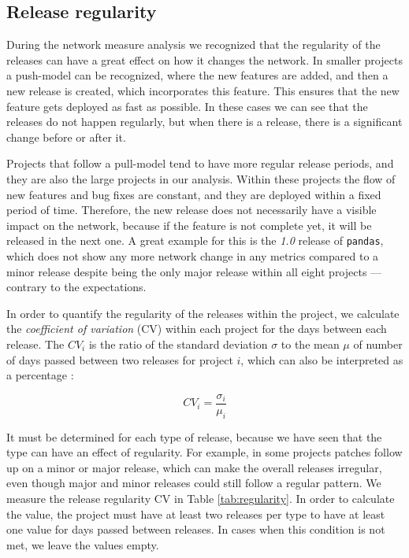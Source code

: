 \subsection{Release regularity}
\label{sec:release_reg}

During the network measure analysis we recognized that the regularity of the releases can have a great effect on how it changes the network. In smaller projects a push-model can be recognized, where the new features are added, and then a new release is created, which incorporates this feature. This ensures that the new feature gets deployed as fast as possible. In these cases we can see that the releases do not happen regularly, but when there is a release, there is a significant change before or after it.

Projects that follow a pull-model tend to have more regular release periods, and they are also the large projects in our analysis. Within these projects the flow of new features and bug fixes are constant, and they are deployed within a fixed period of time. Therefore, the new release does not necessarily have a visible impact on the network, because if the feature is not complete yet, it will be released in the next one. A great example for this is the \textit{1.0} release of \texttt{pandas}, which does not show any more network change in any metrics compared to a minor release despite being the only major release within all eight projects — contrary to the expectations.

In order to quantify the regularity of the releases within the project, we calculate the \textit{coefficient of variation} (CV) within each project for the days between each release. The $CV_i$ is the ratio of the standard deviation $\sigma$ to the mean $\mu$ of number of days passed between two releases for project $i$, which can also be interpreted as a percentage \cite{everittCambridgeDictionaryStatistics1998a}:

\[ CV_i = \frac{\sigma_i}{\mu_i} \]

It must be determined for each type of release, because we have seen that the type can have an effect of regularity. For example, in some projects patches follow up on a minor or major release, which can make the overall releases irregular, even though major and minor releases could still follow a regular pattern. We measure the release regularity CV in Table \ref{tab:regularity}. In order to calculate the value, the project must have at least two releases per type to have at least one value for days passed between releases. In cases when this condition is not met, we leave the values empty.

